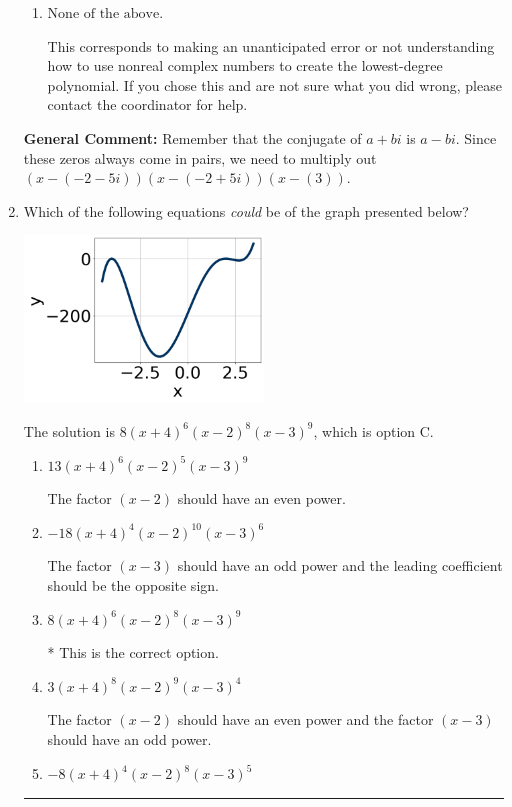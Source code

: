 \documentclass{extbook}[14pt]
\newcommand{\litem}[1]{\item #1

\rule{\textwidth}{0.4pt}}
\begin{document}
\begin{enumerate}
{\begin{enumerate}[label=\Alph*.]
$x^{3} + x^{2} +2 x -15$, which corresponds to multiplying out $(x + 5)(x -3)$.
\item \( \text{None of the above.} \)

This corresponds to making an unanticipated error or not understanding how to use nonreal complex numbers to create the lowest-degree polynomial. If you chose this and are not sure what you did wrong, please contact the coordinator for help.
\end{enumerate}

\textbf{General Comment:} Remember that the conjugate of $a+bi$ is $a-bi$. Since these zeros always come in pairs, we need to multiply out $(x-(-2 - 5 i))(x-(-2 + 5 i))(x-(3))$.
}
\litem{
Which of the following equations \textit{could} be of the graph presented below?

\begin{center}
    \includegraphics[width=0.5\textwidth]{../Figures/polyGraphToFunctionC.png}
\end{center}


The solution is \( 8(x + 4)^{6} (x - 2)^{8} (x - 3)^{9} \), which is option C.\begin{enumerate}[label=\Alph*.]
\item \( 13(x + 4)^{6} (x - 2)^{5} (x - 3)^{9} \)

The factor $(x - 2)$ should have an even power.
\item \( -18(x + 4)^{4} (x - 2)^{10} (x - 3)^{6} \)

The factor $(x - 3)$ should have an odd power and the leading coefficient should be the opposite sign.
\item \( 8(x + 4)^{6} (x - 2)^{8} (x - 3)^{9} \)

* This is the correct option.
\item \( 3(x + 4)^{8} (x - 2)^{9} (x - 3)^{4} \)

The factor $(x - 2)$ should have an even power and the factor $(x - 3)$ should have an odd power.
\item \( -8(x + 4)^{4} (x - 2)^{8} (x - 3)^{5} \)


\end{enumerate}}
\end{enumerate}
\end{document}
